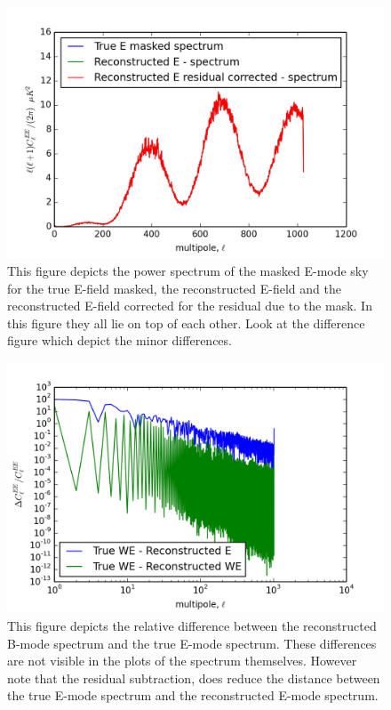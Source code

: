 \documentclass[prd,amsmath,amssymb,floatfix,nofootinbib,preprintnumbers,twocolumn]{revtex4}%
\begin{document}
\begin{figure}[!h]
\includegraphics[scale=0.6]{clee-compare.png}
\caption{This figure depicts the power spectrum of the masked E-mode sky for the true E-field masked, the reconstructed E-field and the reconstructed E-field corrected for the residual due to the mask. In this figure they all lie on top of each other. Look at the difference figure which depict the minor differences.}
\end{figure}

\begin{figure}[!h]
\includegraphics[scale=0.6]{diffclee.png}
\caption{This figure depicts the relative difference between the reconstructed B-mode spectrum and the true E-mode spectrum. These differences are not visible in the plots of the spectrum themselves. However note that the residual subtraction, does reduce the distance between the true E-mode spectrum and the reconstructed E-mode spectrum.}
\end{figure}
\end{document}
